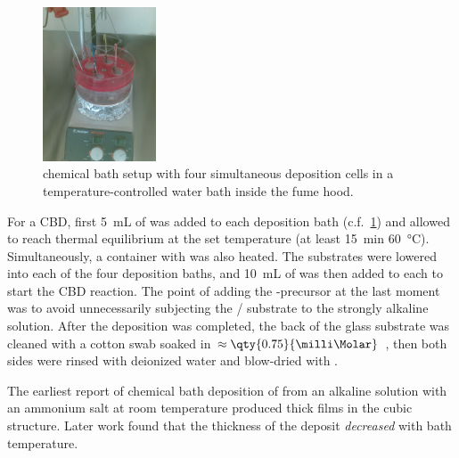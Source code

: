 \documentclass[webedition,openright,titles,swedish,english]{LuaUUThesis}\usepackage[]{graphicx}\usepackage[]{xcolor}
\newcommand{\cf}{c.f.}
\begin{document}
%

\begin{figure}
\centering
\includegraphics[width=0.30\textwidth]{synthesis/chemical-bath-deposition/CBD.jpg}
\caption[CdS CBD setup]{%
    chemical bath setup with four simultaneous deposition cells
   in a temperature-controlled water bath inside the fume hood.
}
\label{fig:0203-CBD-station}
\end{figure}


For a \gls{CBD}, first \qty{5}{\milli\L} of 
was added to each deposition bath (\cf\ \cref{fig:0203-CBD-station})
and allowed to reach thermal equilibrium at the set temperature
(at least \qty{15}{\minute} \qty{60}{\celsius}).
Simultaneously, a container with  was also heated.
The substrates were lowered into each of the four deposition baths, and
\qty{10}{\mL} of  was then added to each to start
the \gls{CBD} reaction.
The point of adding the -precursor at the last moment was to avoid unnecessarily
subjecting the / substrate to the strongly alkaline solution.
After the deposition was completed, the back of the glass substrate was
cleaned with a cotton swab soaked in $\approx\qty{0.75}{\milli\Molar}$ ,
then both sides were rinsed with deionized water and blow-dried with .

The earliest report \cite{Nagao1968} of chemical bath deposition of  from an alkaline
solution with an ammonium salt at room temperature produced thick films in the cubic structure.
Later work \cite{Nair1988,Mondal1983} found that the thickness of the deposit
\emph{decreased} with bath temperature.
\end{document}
